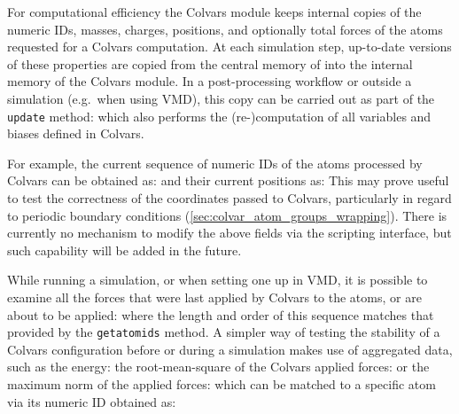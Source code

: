 {

For computational efficiency the Colvars module keeps internal copies of the numeric IDs, masses, charges, positions, and optionally total forces of the atoms requested for a Colvars computation.
At each simulation step, up-to-date versions of these properties are copied from the central memory of \MDENGINE{} into the internal memory of the Colvars module.
In a post-processing workflow or outside a simulation (e.g.\ when using VMD), this copy can be carried out as part of the \texttt{update} method:
\noindent{}which also performs the (re-)computation of all variables and biases defined in Colvars.

For example, the current sequence of numeric IDs of the atoms processed by Colvars can be obtained as:
\noindent{}and their current positions as:
\noindent{}This may prove useful to test the correctness of the coordinates passed to Colvars, particularly in regard to periodic boundary conditions (\ref{sec:colvar_atom_groups_wrapping}).
There is currently no mechanism to modify the above fields via the scripting interface, but such capability will be added in the future.


While running a simulation, or when setting one up in VMD, it is possible to examine all the forces that were last applied by Colvars to the atoms, or are about to be applied:
\noindent{}where the length and order of this sequence matches that provided by the \texttt{getatomids} method.
A simpler way of testing the stability of a Colvars configuration before or during a simulation makes use of aggregated data, such as the energy:
\noindent{}the root-mean-square of the Colvars applied forces:
\noindent{}or the maximum norm of the applied forces:
\noindent{}which can be matched to a specific atom via its numeric ID obtained as:

}
